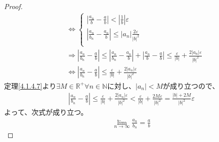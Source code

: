 \documentclass[dvipdfmx]{jsarticle}
\begin{document}
\begin{proof}
\begin{align*}
&\Leftrightarrow \left\{ \begin{matrix}
\left| \frac{a_{n}}{b} - \frac{a}{b} \right| < \left| \frac{1}{b} \right|\varepsilon \\
\left| \frac{a_{n}}{b_{n}} - \frac{a_{n}}{b} \right| \leq \left| a_{n} \right|\frac{2\varepsilon}{|b|^{2}} \\
\end{matrix} \right.\ \\
&\Rightarrow \left| \frac{a_{n}}{b_{n}} - \frac{a}{b} \right| \leq \left| \frac{a_{n}}{b_{n}} - \frac{a_{n}}{b} \right| + \left| \frac{a_{n}}{b} - \frac{a}{b} \right| \leq \frac{\varepsilon}{|b|} + \frac{2\left| a_{n} \right|\varepsilon}{|b|^{2}}\\
&\Leftrightarrow \left| \frac{a_{n}}{b_{n}} - \frac{a}{b} \right| \leq \frac{\varepsilon}{|b|} + \frac{2\left| a_{n} \right|\varepsilon}{|b|^{2}}
\end{align*}
定理\ref{4.1.4.7}より$\exists M \in \mathbb{R}^{+}\forall n \in \mathbb{N}$に対し、$\left| a_{n} \right| < M$が成り立つので、
\begin{align*}
\left| \frac{a_{n}}{b_{n}} - \frac{a}{b} \right| \leq \frac{\varepsilon}{|b|} + \frac{2\left| a_{n} \right|\varepsilon}{|b|^{2}} < \frac{\varepsilon}{|b|} + \frac{2M\varepsilon}{|b|^{2}} = \frac{|b| + 2M}{|b|^{2}}\varepsilon
\end{align*}
よって、次式が成り立つ。
\begin{align*}
\lim_{n \rightarrow \infty}\frac{a_{n}}{b_{n}} = \frac{a}{b}
\end{align*}
\end{proof}
\end{document}
